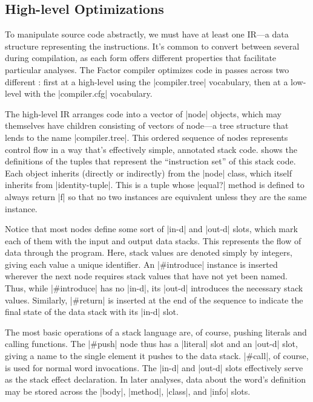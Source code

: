 \subsection{High-level Optimizations}\label{sec:compiler:tree}

To manipulate source code abstractly, we must have at least one \gls{IR}---a
data structure representing the instructions.  It's common to convert between
several  during compilation, as each form offers different
properties that facilitate particular analyses.  The Factor compiler optimizes
code in passes across two different : first at a high-level using
the \factor|compiler.tree| vocabulary, then at a low-level with the
\factor|compiler.cfg| vocabulary.


The high-level \gls{IR} arranges code into a vector of \factor|node| objects,
which may themselves have children consisting of vectors of node---a tree
structure that lends to the name \factor|compiler.tree|.  This ordered sequence
of nodes represents control flow in a way that's effectively simple, annotated
stack code.   shows the definitions of the tuples that represent
the ``instruction set'' of this stack code.  Each object inherits (directly or
indirectly) from the \factor|node| class, which itself inherits from
\factor|identity-tuple|.  This is a tuple whose \factor|equal?| method is
defined to always return \factor|f| so that no two instances are equivalent
unless they are the same instance.

Notice that most nodes define some sort of \factor|in-d| and \factor|out-d|
slots, which mark each of them with the input and output data stacks.  This
represents the flow of data through the program.  Here, stack values are
denoted simply by integers, giving each value a unique identifier.  An
\factor|#introduce| instance is inserted wherever the next node requires stack
values that have not yet been named.  Thus, while \factor|#introduce| has no
\factor|in-d|, its \factor|out-d| introduces the necessary stack values.
Similarly, \factor|#return| is inserted at the end of the sequence to indicate
the final state of the data stack with its \factor|in-d| slot.

The most basic operations of a stack language are, of course, pushing literals
and calling functions.  The \factor|#push| node thus has a \factor|literal|
slot and an \factor|out-d| slot, giving a name to the single element it pushes
to the data stack.  \factor|#call|, of course, is used for normal word
invocations.  The \factor|in-d| and \factor|out-d| slots effectively serve as
the stack effect declaration.  In later analyses, data about the word's
definition may be stored across the \factor|body|, \factor|method|,
\factor|class|, and \factor|info| slots.

